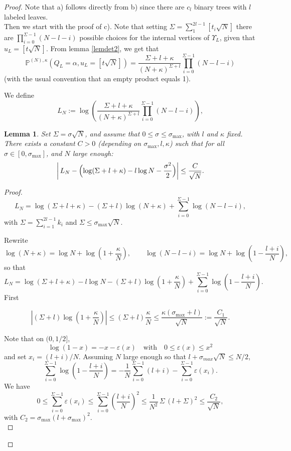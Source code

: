 \documentclass[11pt]{article}
\newtheorem{lemma}{Lemma}[section]
\begin{document}
\begin{proof}
Note that a) follows directly from b) since there are $c_l$ binary trees with $l$ labeled leaves.\\
Then we start with the proof of c). Note that setting $\Sigma=\sum_1^{2l-1}[t_i\sqrt N]$
 there are $\prod_{i=0}^{\Sigma-1}(N-l-i)$ possible choices for the internal vertices of $\Upsilon_L$, given that $u_L=[t\sqrt N]$.
From lemma \ref{lemdet2}, we get that $$\mathbb P^{(N),\kappa} (Q_L=\alpha, u_L=[t\sqrt N])=\frac{\Sigma+l+\kappa}{(N+\kappa)^{\Sigma+l}}\prod_{i=0}^{\Sigma -1}(N-l-i)$$ (with the usual convention that an empty product equals 1).
 

We define
\[
L_N:=\log(\frac{\Sigma+l+\kappa}{(N+\kappa)^{\Sigma+l}}\prod_{i=0}^{\Sigma-1}(N-l-i)),\]

\begin{lemma}
Set $\Sigma=\sigma\sqrt N$, and assume that
$0\le \sigma\le \sigma_{\max}$, with \(l\) and \(\kappa\) fixed.  
There exists a constant \(C>0\)  (depending on
\(\sigma_{\max},l,\kappa\)) such that for all 
\(\sigma\in[0,\sigma_{\max}]\), and $N$ large enough:
\[
\left|\,L_N-\Bigl(\log(\Sigma+l+\kappa)-l\log N-\frac{\sigma^2}{2}\Bigr)\right|
\le \frac{C}{\sqrt N}.
\]
\end{lemma}
\begin{proof}

\[
L_N=\log(\Sigma+l+\kappa)-(\Sigma+l)\log(N+\kappa)
+\sum_{i=0}^{\Sigma-1}\log(N-l-i),
\]
with $\Sigma=\sum_{i=1}^{2l-1}k_i$ and
$\Sigma\le \sigma_{\max}\sqrt N$.

\medskip
\noindent
Rewrite
\[
\log(N+\kappa)=\log N+\log\!\left(1+\frac{\kappa}{N}\right),
\qquad
\log(N-l-i)=\log N+\log\!\left(1-\frac{l+i}{N}\right),
\]
so that
\[
L_N=\log(\Sigma+l+\kappa)-l\log N
-(\Sigma+l)\log\!\left(1+\frac{\kappa}{N}\right)
+\sum_{i=0}^{\Sigma-1}\log\!\left(1-\frac{l+i}{N}\right).
\]
First

\[
\left|(\Sigma+l)\log\!\left(1+\frac{\kappa}{N}\right)\right|
\le
(\Sigma+l)\frac{\kappa}{N}\le
\frac{\kappa(\sigma_{\max}+l)}{\sqrt N}
:=
\frac{C_1}{\sqrt N}.
\]

\medskip
\noindent
Note that on $(0, 1/2]$,
\[
\log(1-x)=-x-\varepsilon(x)
\quad \text{with}\quad
0\le \varepsilon(x) \le x^2
\]
and set $x_i=(l+i)/N$. Assuming $N$ large enough so that $l+\sigma_{max}\sqrt N\le N/2$,
\[
\sum_{i=0}^{\Sigma-1}\log\!\left(1-\frac{l+i}{N}\right)
=
-\frac1N\sum_{i=0}^{\Sigma-1}(l+i)
-\sum_{i=0}^{\Sigma-1}\varepsilon(x_i).
\]
\medskip
\noindent
We have
\[
0\le \sum_{i=0}^{\Sigma-1}\varepsilon(x_i)
\le
\sum_{i=0}^{\Sigma-1}\left(\frac{l+i}{N}\right)^2
\le
\frac{1}{ N^2}\,\Sigma\,(l+\Sigma)^2
\le
\frac{C_2}{\sqrt N},
\]
with $C_2=\sigma_{\max}(l+\sigma_{\max})^2$.\\


\end{proof}
\end{proof}
\end{document}
